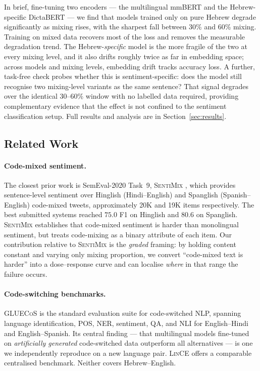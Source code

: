 \documentclass{article}
\begin{document}
In brief, fine-tuning two encoders --- the multilingual mmBERT and the
Hebrew-specific DictaBERT --- we find that models trained only on pure Hebrew
degrade significantly as mixing rises, with the sharpest fall between 30\%
and 60\% mixing. Training on mixed data recovers most of the loss and removes
the measurable degradation trend. The Hebrew-\emph{specific} model is the
more fragile of the two at every mixing level, and it also drifts roughly
twice as far in embedding space; across models and mixing levels, embedding
drift tracks accuracy loss. A further, task-free check probes whether this is
sentiment-specific: does the model still recognise two mixing-level variants
as the same sentence? That signal degrades over the identical 30--60\% window
with no labelled data required, providing complementary evidence that the
effect is not confined to the sentiment classification setup. Full results
and analysis are in Section~\ref{sec:results}.

\subsection{Related Work}

\paragraph{Code-mixed sentiment.} The closest prior work is SemEval-2020
Task~9, \textsc{SentiMix} \citep{patwa2020semeval}, which provides
sentence-level sentiment over Hinglish (Hindi--English) and Spanglish
(Spanish--English) code-mixed tweets, approximately 20K and 19K items
respectively. The best submitted systems reached $75.0$ F1 on Hinglish and
$80.6$ on Spanglish. \textsc{SentiMix} establishes that code-mixed sentiment
is harder than monolingual sentiment, but treats code-mixing as a binary
attribute of each item. Our contribution relative to \textsc{SentiMix} is the
\emph{graded} framing: by holding content constant and varying only mixing
proportion, we convert ``code-mixed text is harder'' into a dose--response
curve and can localise \emph{where} in that range the failure occurs.

\paragraph{Code-switching benchmarks.} \textsc{GLUECoS}
\citep{khanuja2020gluecos} is the standard evaluation suite for code-switched
NLP, spanning language identification, POS, NER, sentiment, QA, and NLI for
English--Hindi and English--Spanish. Its central finding --- that multilingual
models fine-tuned on \emph{artificially generated} code-switched data
outperform all alternatives --- is one we independently reproduce on a new
language pair. \textsc{LinCE} \citep{aguilar2020lince} offers a comparable
centralised benchmark. Neither covers Hebrew--English.
\end{document}
